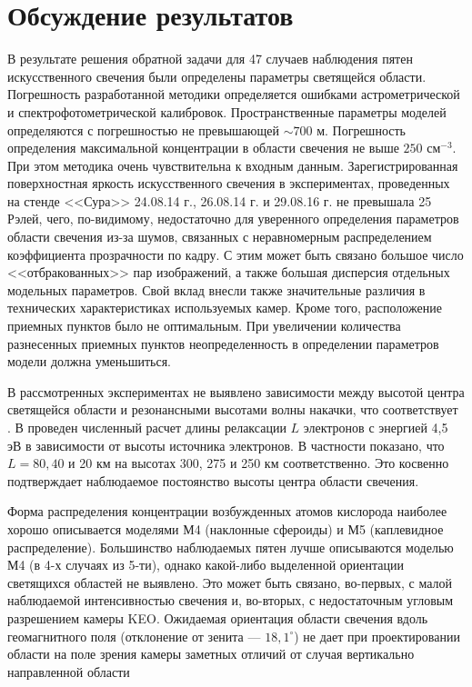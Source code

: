 \documentclass[12pt,a4paper]{article}
\begin{document}
\section{Обсуждение результатов} \label{sec:discuss}

В результате решения обратной задачи для 47 случаев наблюдения пятен искусственного свечения были определены параметры светящейся области. Погрешность разработанной методики определяется ошибками астрометрической и спектрофотометрической калибровок. Пространственные параметры моделей определяются с погрешностью не превышающей $\sim700$ м. Погрешность определения максимальной концентрации в области свечения не выше $250$ см$^{-3}$. При этом методика очень чувствительна к входным данным. Зарегистрированная поверхностная яркость искусственного свечения в экспериментах, проведенных на стенде <<Сура>> 24.08.14 г., 26.08.14 г. и 29.08.16 г. не превышала 25 Рэлей, чего, по-видимому, недостаточно для уверенного определения параметров области свечения из-за шумов, связанных с неравномерным распределением коэффициента прозрачности по кадру. С этим может быть связано большое число <<отбракованных>> пар изображений, а также большая дисперсия отдельных модельных параметров.
Свой вклад внесли также значительные различия в технических характеристиках используемых камер. Кроме того, расположение приемных пунктов было не оптимальным. При увеличении количества разнесенных приемных пунктов неопределенность в определении параметров модели должна уменьшиться.


В рассмотренных экспериментах не выявлено зависимости между высотой центра светящейся области и резонансными высотами волны накачки, что соответствует \cite{Gustavsson2001}.
В \cite{Vaskov1983} проведен численный расчет длины релаксации $L$ электронов с энергией 4,5 эВ в зависимости от высоты источника электронов. В частности показано, что $L=80,40$ и 20 км на высотах 300, 275 и 250 км соответственно. Это косвенно подтверждает 
наблюдаемое постоянство высоты центра области свечения. 


Форма распределения концентрации возбужденных атомов кислорода наиболее хорошо описывается моделями М4 (наклонные сфероиды) и М5 (каплевидное распределение). Большинство наблюдаемых пятен лучше описываются моделью М4 (в 4-х случаях из 5-ти), однако какой-либо выделенной ориентации светящихся областей не выявлено. Это может быть связано, во-первых, с малой наблюдаемой интенсивностью свечения и, во-вторых, с недостаточным угловым разрешением камеры KEO. Ожидаемая ориентация области свечения вдоль геомагнитного поля (отклонение от зенита --- $18,1^\circ$) не дает при проектировании области на поле зрения камеры заметных отличий от случая вертикально направленной области
\end{document}
